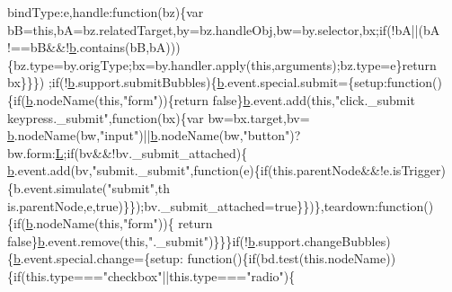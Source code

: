 \begin{DoxyCode}
      bindType:e,handle:\textcolor{keyword}{function}(bz)\{var bB=\textcolor{keyword}{this},bA=bz.relatedTarget,by=bz.handleObj,bw=by.selector,bx;\textcolor{keywordflow}{if}(!bA||(bA
      !==bB&&!\hyperlink{jquery_8js_aa4026ad5544b958e54ce5e106fa1c805}{b}.contains(bB,bA)))\{bz.type=by.origType;bx=by.handler.apply(\textcolor{keyword}{this},arguments);bz.type=e\}\textcolor{keywordflow}{return} bx\}\}\})
      ;\textcolor{keywordflow}{if}(!\hyperlink{jquery_8js_aa4026ad5544b958e54ce5e106fa1c805}{b}.support.submitBubbles)\{\hyperlink{jquery_8js_aa4026ad5544b958e54ce5e106fa1c805}{b}.event.special.submit=\{setup:\textcolor{keyword}{function}()\{\textcolor{keywordflow}{if}(\hyperlink{jquery_8js_aa4026ad5544b958e54ce5e106fa1c805}{b}.nodeName(\textcolor{keyword}{this},\textcolor{stringliteral}{"form"}))\{\textcolor{keywordflow}{return}
       \textcolor{keyword}{false}\}\hyperlink{jquery_8js_aa4026ad5544b958e54ce5e106fa1c805}{b}.event.add(\textcolor{keyword}{this},\textcolor{stringliteral}{"click.\_submit keypress.\_submit"},\textcolor{keyword}{function}(bx)\{var bw=bx.target,bv=
      \hyperlink{jquery_8js_aa4026ad5544b958e54ce5e106fa1c805}{b}.nodeName(bw,\textcolor{stringliteral}{"input"})||\hyperlink{jquery_8js_aa4026ad5544b958e54ce5e106fa1c805}{b}.nodeName(bw,\textcolor{stringliteral}{"button"})?bw.form:\hyperlink{jquery_8js_a38ee4c0b5f4fe2a18d0c783af540d253}{L};\textcolor{keywordflow}{if}(bv&&!bv.\_submit\_attached)\{
      \hyperlink{jquery_8js_aa4026ad5544b958e54ce5e106fa1c805}{b}.event.add(bv,\textcolor{stringliteral}{"submit.\_submit"},\textcolor{keyword}{function}(e)\{\textcolor{keywordflow}{if}(this.parentNode&&!e.isTrigger)\{b.event.simulate(\textcolor{stringliteral}{"submit"},th
      is.parentNode,e,true)\}\});bv.\_submit\_attached=\textcolor{keyword}{true}\}\})\},teardown:\textcolor{keyword}{function}()\{\textcolor{keywordflow}{if}(\hyperlink{jquery_8js_aa4026ad5544b958e54ce5e106fa1c805}{b}.nodeName(\textcolor{keyword}{this},\textcolor{stringliteral}{"form"}))\{\textcolor{keywordflow}{
      return} \textcolor{keyword}{false}\}\hyperlink{jquery_8js_aa4026ad5544b958e54ce5e106fa1c805}{b}.event.remove(\textcolor{keyword}{this},\textcolor{stringliteral}{".\_submit"})\}\}\}\textcolor{keywordflow}{if}(!\hyperlink{jquery_8js_aa4026ad5544b958e54ce5e106fa1c805}{b}.support.changeBubbles)\{\hyperlink{jquery_8js_aa4026ad5544b958e54ce5e106fa1c805}{b}.event.special.change=\{setup:\textcolor{keyword}{
      function}()\{\textcolor{keywordflow}{if}(bd.test(\textcolor{keyword}{this}.nodeName))\{\textcolor{keywordflow}{if}(this.type===\textcolor{stringliteral}{"checkbox"}||this.type===\textcolor{stringliteral}{"radio"})\{

\end{DoxyCode}
